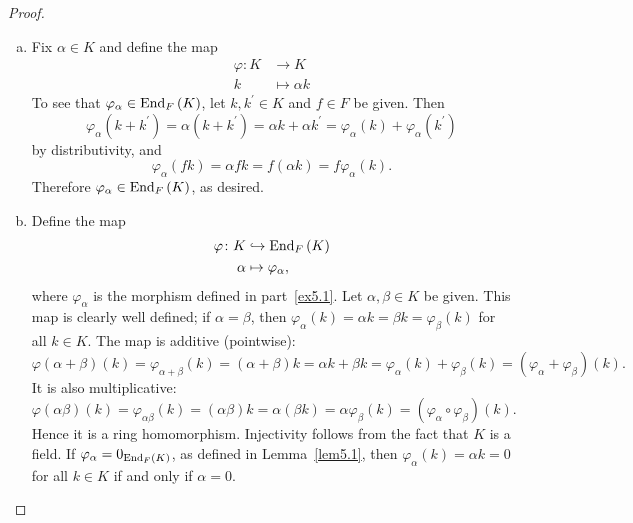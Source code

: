 \documentclass[10pt]{amsart}
\begin{document}
\begin{thm}
  \begin{proof}
    \begin{enumerate}[(a)]
    \item\label{ex5.1}
      Fix $\alpha \in K$ and define the map
      \begin{align*}
        \varphi \colon K &\rightarrow K\\
        k &\mapsto \alpha k
      \end{align*}
      To see that $\varphi_\alpha \in \operatorname{End}_{F}\left(K\right)$, let $k, k^\prime \in K$ and $f \in F$ be given.
    Then 
    $$\varphi_\alpha(k + k^\prime) = \alpha(k + k^\prime) = \alpha k + \alpha k^\prime = \varphi_\alpha(k) + \varphi_\alpha(k^\prime)$$
    by distributivity, and
    $$\varphi_\alpha(fk) = \alpha fk = f(\alpha k) = f\varphi_\alpha(k).$$
    Therefore $\varphi_\alpha \in \operatorname{End}_{F}\left(K\right)$, as desired. 
\item
  Define the map 
  \begin{align*}
    \varphi \colon K & \hookrightarrow \operatorname{End}_{F}\left(K\right)\\
  \alpha & \mapsto \varphi_\alpha,
\end{align*}
where $\varphi_\alpha$ is the morphism defined in part~\ref{ex5.1}.
Let $\alpha, \beta \in K$ be given.
This map is clearly well defined; if $\alpha = \beta$, then $\varphi_\alpha(k) = \alpha k = \beta k = \varphi_\beta(k)$ for all $k \in K$.
The map is additive (pointwise): $$\varphi(\alpha + \beta)(k) = \varphi_{\alpha + \beta}(k) = (\alpha + \beta) k = \alpha k + \beta k = \varphi_\alpha(k) + \varphi_\beta(k) = (\varphi_\alpha + \varphi_\beta)(k).$$
It is also multiplicative:
$$\varphi(\alpha\beta)(k) = \varphi_{\alpha\beta}(k) = (\alpha\beta) k = \alpha(\beta k) = \alpha\varphi_\beta(k) = (\varphi_\alpha \circ \varphi_\beta)(k).$$
Hence it is a ring homomorphism.
Injectivity follows from the fact that $K$ is a field.
If $\varphi_\alpha = 0_{\operatorname{End}_{F}\left(K\right)}$, as defined in Lemma~\ref{lem5.1}, then $\varphi_\alpha(k) = \alpha k = 0$ for all $k \in K$ if and only if $\alpha = 0$.


\end{enumerate}
\end{proof}
\end{thm}
\end{document}
